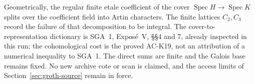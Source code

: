 Geometrically, the regular finite etale coefficient
of the cover $\operatorname{Spec}H\to\operatorname{Spec}K$
splits over the coefficient field into Artin characters.
The finite lattices $C_2,C_3$ record the failure of
that decomposition to be integral.  The cover-to-
representation dictionary is SGA~1, Expos\'e~V,
\S\S4 and 7, already inspected in this run; the
cohomological cost is the proved AC-K19, not an
attribution of a numerical inequality to SGA~1.
The direct sums are finite and the Galois base remains
fixed.  No new archive cote or scan is claimed,
and the access limits of Section~\ref{sec:groth-source}
remain in force.
